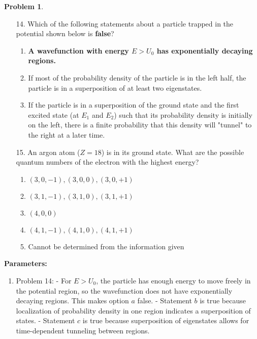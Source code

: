 \documentclass[12pt]{article}
\theoremstyle{definition} %
\newtheorem{problem}{Problem}
\theoremstyle{plain} %
\begin{document}
\begin{problem}
    \begin{enumerate}
        \item[14.] Which of the following statements about a particle trapped in the potential shown below is \textbf{false}?
        \begin{enumerate}
            \item \textbf{A wavefunction with energy \(E > U_0\) has exponentially decaying regions.}
            \item If most of the probability density of the particle is in the left half, the particle is in a superposition of at least two eigenstates.
            \item If the particle is in a superposition of the ground state and the first excited state (at \(E_1\) and \(E_2\)) such that its probability density is initially on the left, there is a finite probability that this density will "tunnel" to the right at a later time.
        \end{enumerate}
    
        \item[15.] An argon atom (\(Z = 18\)) is in its ground state. What are the possible quantum numbers of the electron with the highest energy?
        \begin{enumerate}
            \item \((3, 0, -1), (3, 0, 0), (3, 0, +1)\)
            \item \textbf{\((3, 1, -1), (3, 1, 0), (3, 1, +1)\)}
            \item \((4, 0, 0)\)
            \item \((4, 1, -1), (4, 1, 0), (4, 1, +1)\)
            \item Cannot be determined from the information given
        \end{enumerate}
    \end{enumerate}
    
    \textbf{Parameters:}
    \begin{enumerate}
        \item Problem 14:
        - For \(E > U_0\), the particle has enough energy to move freely in the potential region, so the wavefunction does not have exponentially decaying regions. This makes option \(a\) false.
        - Statement \(b\) is true because localization of probability density in one region indicates a superposition of states.
        - Statement \(c\) is true because superposition of eigenstates allows for time-dependent tunneling between regions.
    

\end{enumerate}
\end{problem}
\end{document}
